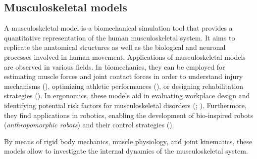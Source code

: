 \subsection{Musculoskeletal models}
A musculoskeletal model is a biomechanical simulation tool that provides a quantitative representation of the human musculoskeletal system. It aims to replicate the anatomical structures as well as the biological and neuronal processes involved in human movement.
Applications of musculoskeletal models are observed in various fields. In biomechanics, they can be employed for estimating muscle forces and joint contact forces in order to understand injury mechanisms (\cite{renIdentificationKineticAbnormalities2022}), optimizing athletic performances (\cite{yeadonFiftyYearsPerformancerelated2023}), or designing rehabilitation strategies (\cite{weigelBiomechanicsRehabilitation2005}).
In ergonomics, these models aid in evaluating workplace design and identifying potential risk factors for musculoskeletal disorders (\cite{davidErgonomicMethodsAssessing2005}; \cite{granataLowBackBiomechanicsStatic2005}). Furthermore, they find applications in robotics, enabling the development of bio-inspired robots (\emph{anthropomorphic robots}) and their control strategies (\cite{aswiniBiomechanicsInspiredControlStrategies2023}).

By means of rigid body mechanics, muscle physiology, and joint kinematics, these models allow to investigate the internal dynamics of the musculoskeletal system.

